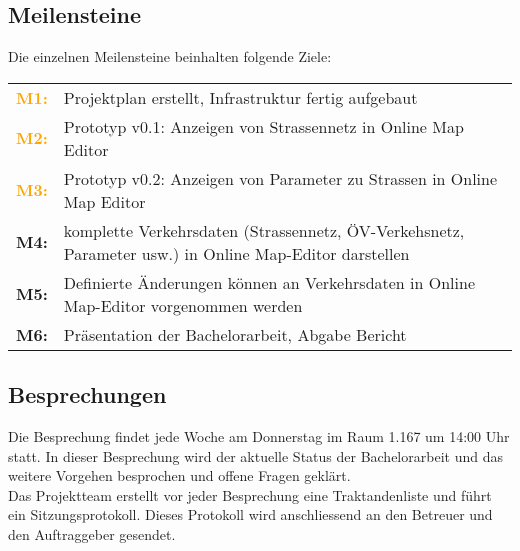 \documentclass[10pt,a4paper]{article}
\begin{document}
\subsection{Meilensteine}
\begin{flushleft}
Die einzelnen Meilensteine beinhalten folgende Ziele:
\end{flushleft}
\begin{tabular}{cl}
	\textcolor{Orange}{\textbf{M1:}} & Projektplan erstellt, Infrastruktur fertig aufgebaut \\[0.2cm]
	\textcolor{Orange}{\textbf{M2:}} & Prototyp v0.1: Anzeigen von Strassennetz in Online Map Editor \\[0.2cm]
	\textcolor{Orange}{\textbf{M3:}} & Prototyp v0.2: Anzeigen von Parameter zu Strassen in Online Map Editor \\[0.2cm]
	\textcolor{NavyBlue}{\textbf{M4:}} & komplette Verkehrsdaten (Strassennetz, ÖV-Verkehsnetz, Parameter usw.) in Online Map-Editor darstellen\\[0.2cm]
	\textcolor{NavyBlue}{\textbf{M5:}} & Definierte Änderungen können an Verkehrsdaten in Online Map-Editor vorgenommen werden\\[0.2cm]
	\textcolor{Dandelion}{\textbf{M6:}} & Präsentation der Bachelorarbeit, Abgabe Bericht\\
\end{tabular}
\subsection{Besprechungen}
\begin{flushleft}
	Die Besprechung findet jede Woche am Donnerstag im Raum 1.167 um 14:00 Uhr statt. In dieser Besprechung wird der aktuelle Status der Bachelorarbeit und das weitere Vorgehen besprochen und offene Fragen geklärt.\\
Das Projektteam erstellt vor jeder Besprechung eine Traktandenliste und führt ein Sitzungsprotokoll. Dieses Protokoll wird anschliessend an den Betreuer und den Auftraggeber gesendet.
\end{flushleft}

\newpage

\end{document}

